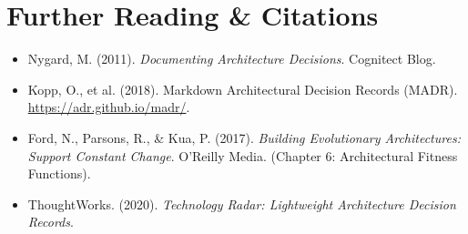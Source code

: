 \section{Further Reading \protect\& Citations}
\begin{itemize}[leftmargin=18pt]
  \item Nygard, M. (2011). \textit{Documenting Architecture Decisions}. Cognitect Blog.
  \item Kopp, O., et al. (2018). Markdown Architectural Decision Records (MADR). \url{https://adr.github.io/madr/}.
  \item Ford, N., Parsons, R., \& Kua, P. (2017). \textit{Building Evolutionary Architectures: Support Constant Change}. O'Reilly Media. (Chapter 6: Architectural Fitness Functions).
  \item ThoughtWorks. (2020). \textit{Technology Radar: Lightweight Architecture Decision Records}.
\end{itemize}
